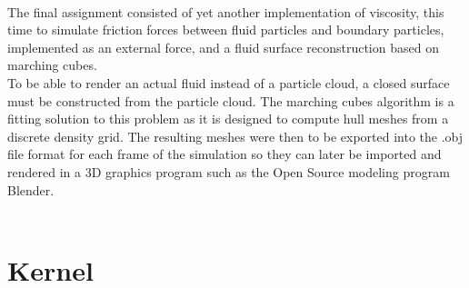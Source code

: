 \documentclass{ACGSeminar}
\begin{document}
\\
The final assignment consisted of yet another implementation of viscosity, this time to simulate friction forces between fluid particles and boundary particles, implemented as an external force, and a fluid surface reconstruction based on marching cubes. \\
To be able to render an actual fluid instead of a particle cloud, a closed surface must be constructed from the particle cloud. The marching cubes algorithm is a fitting solution to this problem as it is designed to compute hull meshes from a discrete density grid.
The resulting meshes were then to be exported into the .obj file format for each frame of the simulation so they can later be imported and rendered in a 3D graphics program such as the Open Source modeling program Blender.\\
\\

\section{Kernel}
\end{document}
